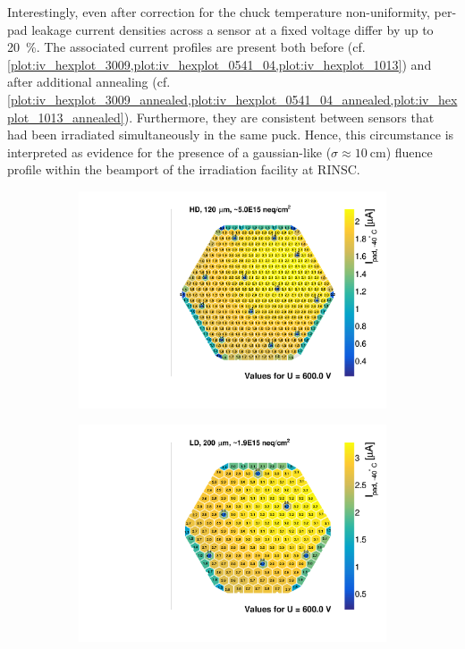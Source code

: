 Interestingly, even after correction for the chuck temperature non-uniformity, per-pad leakage current densities across a sensor at a fixed voltage differ by up to \SI{20}{\percent}.
The associated current profiles are present both before (cf. \ref{plot:iv_hexplot_3009,plot:iv_hexplot_0541_04,plot:iv_hexplot_1013}) and after additional annealing (cf. \ref{plot:iv_hexplot_3009_annealed,plot:iv_hexplot_0541_04_annealed,plot:iv_hexplot_1013_annealed}).
Furthermore, they are consistent between sensors that had been irradiated simultaneously in the same puck.
Hence, this circumstance is interpreted as evidence for the presence of a gaussian-like ($\sigma\approx\SI{10}{\centi\metre}$) fluence profile within the beamport of the irradiation facility at RINSC.
\begin{figure}
	\captionsetup[subfigure]{aboveskip=-1pt,belowskip=-1pt}
	\centering
	\begin{subfigure}[b]{0.32\textwidth}
		\includegraphics[width=0.999\textwidth]{plots/iv_hexplots/3009.pdf}
		\subcaption{
		}
		\label{plot:iv_hexplot_3009}
	\end{subfigure}
	\hfill
	\begin{subfigure}[b]{0.32\textwidth}
		\includegraphics[width=0.999\textwidth]{plots/iv_hexplots/0541_04.pdf}

\end{subfigure}
\end{figure}

